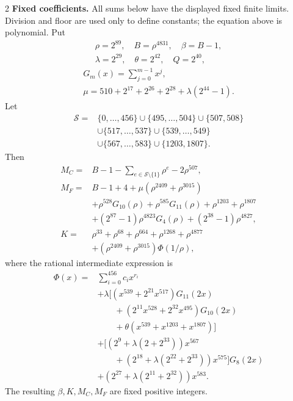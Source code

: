 \documentclass[10pt]{article}
\let\bigsum\sum
\renewcommand{\sum}{\bigsum\nolimits}
\newcommand{\rng}[2]{\{#1,\ldots,#2\}}
\begin{document}
\begin{multicols}{2}
\textbf{Fixed coefficients.}
All sums below have the displayed fixed finite limits. Division and
floor are used only to define constants; the equation above is polynomial.
Put
\[
\begin{gathered}
\rho=2^{89},\quad B=\rho^{4831},\quad\beta=B-1,\\
\lambda=2^{29},\quad\theta=2^{42},\quad Q=2^{40},
\end{gathered}
\]
\[
\begin{gathered}
G_m(x)=\sum_{j=0}^{m-1}x^j,\\
\mu=510+2^{17}+2^{26}+2^{28}+\lambda(2^{44}-1).
\end{gathered}
\]
Let
\begin{align*}
\mathcal S={}&\rng0{456}\cup\rng{495}{504}\cup\{507,508\}\\
 &\cup\rng{517}{537}\cup\rng{539}{549}\\
 &\cup\rng{567}{583}\cup\{1203,1807\}.
\end{align*}
Then
\begin{align*}
M_C={}&B-1-\sum_{e\in\mathcal S\setminus\{1\}}\rho^e-2\rho^{507},\\
M_F={}&B-1+4+\mu(\rho^{2409}+\rho^{3015})\\
 &+\rho^{528}G_{10}(\rho)+\rho^{585}G_{11}(\rho)+\rho^{1203}+\rho^{1807}\\
 &+(2^{87}-1)\rho^{4823}G_4(\rho)+(2^{38}-1)\rho^{4827},\\
K={}&\rho^{33}+\rho^{68}+\rho^{664}+\rho^{1268}+\rho^{4877}\\
 &+(\rho^{2409}+\rho^{3015})\Phi(1/\rho),
\end{align*}
where the rational intermediate expression is
\begin{align*}
\Phi(x)={}&\sum_{i=0}^{456}c_i x^{r_i}\\
 &+\lambda\bigl[(x^{539}+2^{21}x^{517})G_{11}(2x)\\
 &\qquad +(2^{11}x^{528}+2^{32}x^{495})G_{10}(2x)\\
 &\qquad +\theta(x^{539}+x^{1203}+x^{1807})\bigr]\\
 &+\bigl[(2^9+\lambda(2+2^{33}))x^{567}\\
 &\qquad +(2^{18}+\lambda(2^{22}+2^{33}))x^{575}\bigr]G_8(2x)\\
 &+(2^{27}+\lambda(2^{11}+2^{32}))x^{583}.
\end{align*}
The resulting $\beta,K,M_C,M_F$ are fixed positive integers.


\end{multicols}
\end{document}
